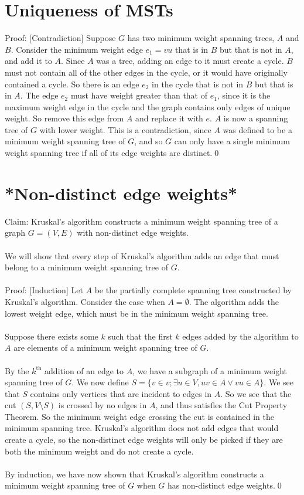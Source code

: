 \documentclass{article}
\begin{document}
\section{Uniqueness of MSTs}
	Proof: [Contradiction]
	Suppose $G$ has two minimum weight spanning trees, $A$ and $B$. Consider the minimum weight
	edge $e_1=vu$ that is in $B$ but that is not in $A$, and add it to $A$. Since $A$ was a tree,
	adding an edge to it must create a cycle. $B$ must not contain all of the other	edges in the
	cycle, or it would have originally contained a cycle. So there is an edge $e_2$ in the cycle that
	is not in $B$ but that is in $A$. The edge $e_2$ must have weight greater than that of $e_1$,
	since it is the maximum weight edge in the cycle and the graph contains only edges of unique
	weight. So remove this edge from $A$ and replace it with $e$. $A$ is now a spanning tree of
	$G$ with lower weight. This is a contradiction, since $A$ was defined to be a minimum weight
	spanning tree of $G$, and so $G$ can only have a single minimum weight spanning tree if all
	of its edge weights are distinct.\qed{}
\section*{*Non-distinct edge weights*}
	Claim: Kruskal's algorithm constructs a minimum weight spanning tree of a graph $G=(V,E)$ with
	non-distinct edge weights.\\\\
	We will show that every step of Kruskal's algorithm adds an edge that must belong to a
	minimum weight spanning tree of $G$.\\\\
	Proof: [Induction] Let $A$ be the partially complete spanning tree constructed by Kruskal's
	algorithm. Consider the case when $A=\emptyset$. The algorithm adds the lowest weight edge,
	which must be in the minimum weight spanning tree. \\\\
	Suppose there exists some $k$ such that the first $k$ edges added by the algorithm to $A$
	are elements of a minimum weight spanning tree of $G$.\\\\
	By the $k^{\text{th}}$ addition of an edge to $A$, we have a subgraph of a minimum weight
	spanning tree of $G$. We now define $S=\{v\in{v};\exists{u\in{V}},{uv}\in{A}\lor{vu}\in{A}\}$.
	We see that $S$ contains only vertices that are incident to edges in $A$. So we see that the
	cut $(S,V\setminus{S})$ is crossed by no edges in $A$, and thus satisfies the Cut Property
	Theorem. So the minimum weight edge crossing the cut is contained in the minimum spanning tree.
	Kruskal's algorithm does not add edges that would create a cycle, so the non-distinct edge
	weights will only be picked if they are both the minimum weight and do not create a cycle.\\\\
	By induction, we have now shown that Kruskal's algorithm constructs a minimum weight spanning
	tree of $G$ when $G$ has non-distinct edge weights.\qed{}
\end{document}
